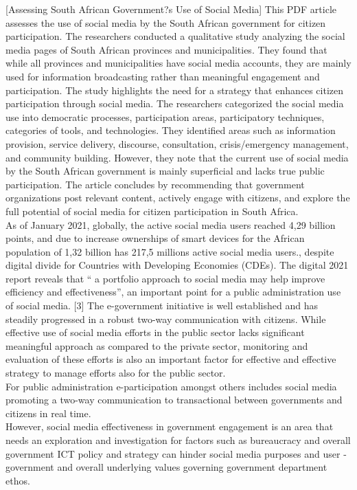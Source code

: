 [Assessing South African Government?s Use of Social Media] This PDF article assesses the use of social media by the South African government for citizen participation. The researchers conducted a qualitative study analyzing the social media pages of South African provinces and municipalities. They found that while all provinces and municipalities have social media accounts, they are mainly used for information broadcasting rather than meaningful engagement and participation. The study highlights the need for a strategy that enhances citizen participation through social media. The researchers categorized the social media use into democratic processes, participation areas, participatory techniques, categories of tools, and technologies. They identified areas such as information provision, service delivery, discourse, consultation, crisis/emergency management, and community building. However, they note that the current use of social media by the South African government is mainly superficial and lacks true public participation. The article concludes by recommending that government organizations post relevant content, actively engage with citizens, and explore the full potential of social media for citizen participation in South Africa.\\
[1] As of January 2021, globally, the active social media users reached 4,29 billion points, and due to increase ownerships of smart devices for the African population of 1,32 billion has 217,5 millions active social media users., despite digital divide for Countries with Developing Economies (CDEs). The digital 2021 report reveals that “ a portfolio approach to social media may help improve efficiency and effectiveness”, an important point for a public administration use of social media.  [3] The e-government initiative is well established and has steadily progressed in a robust two-way communication with citizens.  While effective use of social media efforts in the public sector lacks significant meaningful approach as compared to the private sector, monitoring and evaluation of these efforts is also an important factor for effective and effective strategy to manage efforts also for the public sector. \\
[2]For public administration e-participation amongst others includes social media promoting a two-way communication to transactional between governments and citizens in real time.\\  However, social media effectiveness in government engagement is an area that needs an exploration and investigation for factors such as bureaucracy and overall government ICT policy and strategy can hinder social media purposes and user - government and overall underlying values governing government department ethos.\\
[Chapter 4 Measuring the impact of social media use in the public sector]\\

